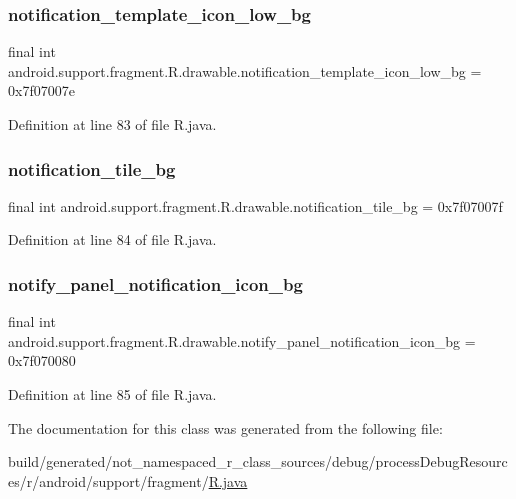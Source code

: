 \subsubsection{\texorpdfstring{notification\_template\_icon\_low\_bg}{notification\_template\_icon\_low\_bg}}
{\footnotesize\ttfamily final int android.\+support.\+fragment.\+R.\+drawable.\+notification\+\_\+template\+\_\+icon\+\_\+low\+\_\+bg = 0x7f07007e\hspace{0.3cm}{\ttfamily [static]}}



Definition at line 83 of file R.\+java.

\mbox{\label{classandroid_1_1support_1_1fragment_1_1_r_1_1drawable_a424a9574524ba829feba39ffb0d5f208}} 
\subsubsection{\texorpdfstring{notification\_tile\_bg}{notification\_tile\_bg}}
{\footnotesize\ttfamily final int android.\+support.\+fragment.\+R.\+drawable.\+notification\+\_\+tile\+\_\+bg = 0x7f07007f\hspace{0.3cm}{\ttfamily [static]}}



Definition at line 84 of file R.\+java.

\mbox{\label{classandroid_1_1support_1_1fragment_1_1_r_1_1drawable_a5972fbc11817ad2e0cbb34f744075a95}} 
\subsubsection{\texorpdfstring{notify\_panel\_notification\_icon\_bg}{notify\_panel\_notification\_icon\_bg}}
{\footnotesize\ttfamily final int android.\+support.\+fragment.\+R.\+drawable.\+notify\+\_\+panel\+\_\+notification\+\_\+icon\+\_\+bg = 0x7f070080\hspace{0.3cm}{\ttfamily [static]}}



Definition at line 85 of file R.\+java.



The documentation for this class was generated from the following file\+:\begin{DoxyCompactItemize}
\item 
build/generated/not\+\_\+namespaced\+\_\+r\+\_\+class\+\_\+sources/debug/process\+Debug\+Resources/r/android/support/fragment/\mbox{\hyperlink{android_2support_2fragment_2_r_8java}{R.\+java}}\end{DoxyCompactItemize}
